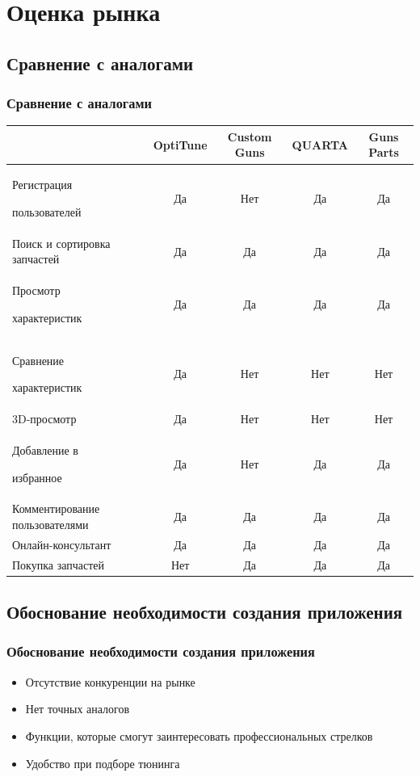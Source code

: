 \documentclass[10pt,utf8,presentation,notheorems,xcolor=dvipsnames,compress]{beamer}
\begin{document}
\section{Оценка рынка}
\subsection{Сравнение с аналогами}
\begin{frame}[fragile,t]
\frametitle{Сравнение с аналогами}
\vskip -0.15cm
\begin{table}[H]

\begin{center}
\begin{tabular}{|p{}|c|c|c|c|}
\hline
 & OptiTune & Custom Guns & QUARTA & Guns Parts \\
\hline
Регистрация 

пользователей & Да & Нет & Да & Да\\
\hline
Поиск и сортировка запчастей & Да & Да & Да & Да\\
\hline
Просмотр 

характеристик & Да & Да & Да & Да\\
\hline
Сравнение 

характеристик & Да & Нет & Нет & Нет\\
\hline
3D-просмотр & Да & Нет & Нет & Нет\\
\hline
Добавление в 

избранное & Да & Нет & Да & Да\\
\hline
Комментирование пользователями & Да & Да & Да & Да \\
\hline
Онлайн-консультант & Да & Да & Да & Да\\
\hline
Покупка запчастей & Нет & Да & Да & Да\\
\hline
\end{tabular}
\end{center}
\end{table}
\end{frame}



\subsection{Обоснование необходимости создания приложения}
\begin{frame}[fragile,t]
\frametitle{Обоснование необходимости создания приложения}
\begin{block}{}
\begin{itemize}
\item Отсутствие конкуренции на рынке
\item Нет точных аналогов
\item Функции, которые смогут заинтересовать профессиональных стрелков
\item Удобство при подборе тюнинга
\end{itemize}
\end{block}
\end{frame}
\end{document}
